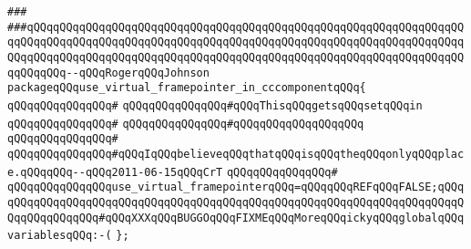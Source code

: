 \verb|###|\newline
\verb|###qQQqqQQqqQQqqQQqqQQqqQQqqQQqqQQqqQQqqQQqqQQqqQQqqQQqqQQqqQQqqQQqqQQqqQQqqQQqqQQqqQQqqQQqqQQqqQQqqQQqqQQqqQQqqQQqqQQqqQQqqQQqqQQqqQQqqQQqqQQqqQQqqQQqqQQqqQQqqQQqqQQqqQQqqQQqqQQqqQQqqQQqqQQqqQQqqQQqqQQqqQQqqQQqqQQqqQQq--qQQqRogerqQQqJohnson|\newline
\newline
\newline
\newline
\verb|packageqQQquse_virtual_framepointer_in_cccomponentqQQq{|\newline
\verb|qQQqqQQqqQQqqQQq#|\newline
\verb|qQQqqQQqqQQqqQQq#qQQqThisqQQqgetsqQQqsetqQQqin|\newline
\verb|qQQqqQQqqQQqqQQq#|\newline
\verb|qQQqqQQqqQQqqQQq#qQQqqQQqqQQqqQQqqQQq|\newline
\verb|qQQqqQQqqQQqqQQq#|\newline
\verb|qQQqqQQqqQQqqQQq#qQQqIqQQqbelieveqQQqthatqQQqisqQQqtheqQQqonlyqQQqplace.qQQqqQQq--qQQq2011-06-15qQQqCrT|\newline
\verb|qQQqqQQqqQQqqQQq#|\newline
\verb|qQQqqQQqqQQqqQQquse_virtual_framepointerqQQq=qQQqqQQqREFqQQqFALSE;qQQqqQQqqQQqqQQqqQQqqQQqqQQqqQQqqQQqqQQqqQQqqQQqqQQqqQQqqQQqqQQqqQQqqQQqqQQqqQQqqQQqqQQq#qQQqXXXqQQqBUGGOqQQqFIXMEqQQqMoreqQQqickyqQQqglobalqQQqvariablesqQQq:-(|\newline
\verb|};|\newline

